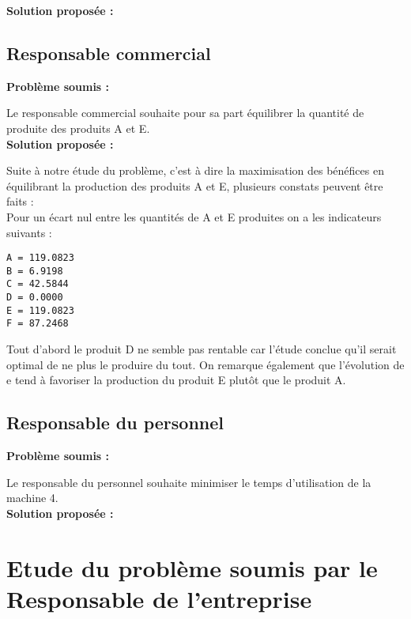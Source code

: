 \documentclass[paper=a4, fontsize=11pt]{scrartcl}
\numberwithin{equation}{section}		%
\numberwithin{figure}{section}			%
\numberwithin{table}{section}				%
\renewcommand{\bf}[1]{\textbf{#1}}
\begin{document}
\bf{Solution proposée :}

\subsection{Responsable commercial}
\bf{Problème soumis :}

Le responsable commercial souhaite pour sa part équilibrer la quantité de produite des produits A et E.\\

\bf{Solution proposée :}

Suite à notre étude du problème, c'est à dire la maximisation des bénéfices en équilibrant la production des produits A et E, plusieurs constats peuvent être faits :\\
Pour un écart nul entre les quantités de A et E produites on a les indicateurs suivants :
\begin{verbatim}
A = 119.0823
B = 6.9198
C = 42.5844
D = 0.0000
E = 119.0823
F = 87.2468
\end{verbatim}
Tout d'abord le produit D ne semble pas rentable car l'étude conclue qu'il serait optimal de ne plus le produire du tout.
On remarque également que l’évolution de e tend à favoriser la production du produit E plutôt que le produit A.

\subsection{Responsable du personnel}
\bf{Problème soumis :}

Le responsable du personnel souhaite minimiser le temps d'utilisation de la machine 4.\\

\bf{Solution proposée :}

\section{Etude du problème soumis par le Responsable de l'entreprise}

\end{document}
